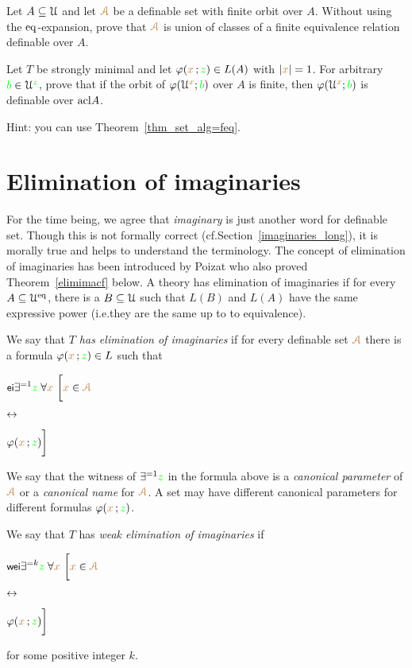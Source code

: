 \begin{exercise}\label{ex_feqthm_senza_eq}
Let $A\subseteq\EuScript U$ and let ${\color{brown}\EuScript A}$ be a definable set with finite orbit over $A$.
Without using the ${{\rm eq}}$-expansion, prove that ${\color{brown}\EuScript A}$ is union of classes of a finite equivalence relation definable over $A$.
\end{exercise}

\begin{exercise}
Let $T$ be strongly minimal and let $\varphi({\color{brown} x}\,;{\color{green} z})\in L(A)$ with $|{\color{brown} x}|=1$.
For arbitrary ${\color{green} b}\in\EuScript U^{\color{green} z}$, prove that if the orbit of $\varphi(\EuScript U^{\color{brown} x}; {\color{green} b})$ over $A$ is finite, then $\varphi(\EuScript U^{\color{brown} x}; {\color{green} b})$ is definable over ${\rm acl} A$.

Hint: you can use Theorem~\ref{thm_set_alg=feq}.
\end{exercise}


\section{Elimination of imaginaries}\label{elimination_imaginaries}

\def\medrel#1{\parbox[t]{5ex}{$\displaystyle\hfil #1$}}
\def\ceq#1#2#3{\parbox[t]{30ex}{$\displaystyle #1$}\medrel{#2}{$\displaystyle #3$}}

For the time being, we agree that \textit{imaginary\/} is just another word for definable set.
Though this is not formally correct (cf.\@ Section~\ref{imaginaries_long}), it is morally true and helps to understand the terminology.
The concept of elimination of imaginaries has been introduced by Poizat who also proved Theorem~\ref{elimimacf} below.
A theory has elimination of imaginaries if for every $A\subseteq\EuScript U^{{\rm eq}}$, there is a $B\subseteq\EuScript U$ such that $L(B)$ and $L(A)$ have the same expressive power (i.e.\@ they are the same up to to equivalence).


\begin{definition}\label{defelimanazioneimmaginari}
We say that \emph{$T$ has elimination of imaginaries\/} if for every definable set ${\color{brown}\EuScript A}$ there is a formula $\varphi({\color{brown} x}\,;{\color{green} z})\in L$ such that\smallskip

\ceq{\ssf{ei}\hfill\E^{=1} {\gr z}\;\A {\mr x}\ \bigg[{\mr x}\in{\vl\Aa}}{\iff}{\phi({\mr x}\,;{\gr z})\bigg]}

We say that the witness of $\exists^{=1}{\color{green} z}$ in the formula above is a \emph{canonical parameter\/} of ${\color{brown}\EuScript A}$ or a \emph{canonical name\/} for ${\color{brown}\EuScript A}$.
A set may have different canonical parameters for different formulas $\varphi({\color{brown} x}\,;{\color{green} z})$.

We say that $T$ has \emph{weak elimination of imaginaries\/} if\smallskip

\ceq{\ssf{wei}\hfill\E^{=k} {\gr z}\;\A {\mr x}\ \bigg[{\mr x}\in{\vl\Aa}}{\iff}{\phi({\mr x}\,;{\gr z})\bigg]}

for some positive integer $k$.
\end{definition}

